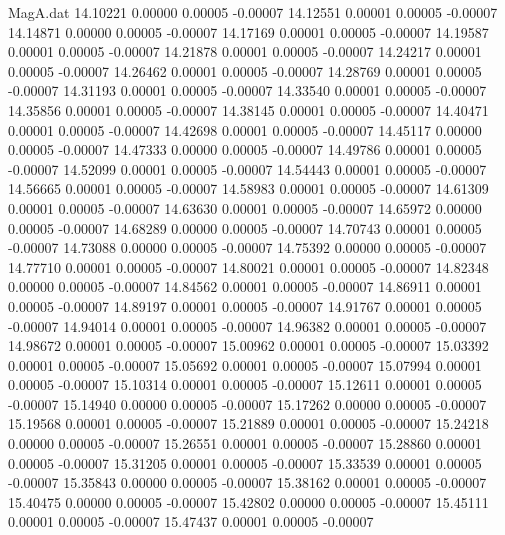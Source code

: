 \begin{filecontents}{MagA.dat}
  14.10221    0.00000    0.00005   -0.00007
  14.12551    0.00001    0.00005   -0.00007
  14.14871    0.00000    0.00005   -0.00007
  14.17169    0.00001    0.00005   -0.00007
  14.19587    0.00001    0.00005   -0.00007
  14.21878    0.00001    0.00005   -0.00007
  14.24217    0.00001    0.00005   -0.00007
  14.26462    0.00001    0.00005   -0.00007
  14.28769    0.00001    0.00005   -0.00007
  14.31193    0.00001    0.00005   -0.00007
  14.33540    0.00001    0.00005   -0.00007
  14.35856    0.00001    0.00005   -0.00007
  14.38145    0.00001    0.00005   -0.00007
  14.40471    0.00001    0.00005   -0.00007
  14.42698    0.00001    0.00005   -0.00007
  14.45117    0.00000    0.00005   -0.00007
  14.47333    0.00000    0.00005   -0.00007
  14.49786    0.00001    0.00005   -0.00007
  14.52099    0.00001    0.00005   -0.00007
  14.54443    0.00001    0.00005   -0.00007
  14.56665    0.00001    0.00005   -0.00007
  14.58983    0.00001    0.00005   -0.00007
  14.61309    0.00001    0.00005   -0.00007
  14.63630    0.00001    0.00005   -0.00007
  14.65972    0.00000    0.00005   -0.00007
  14.68289    0.00000    0.00005   -0.00007
  14.70743    0.00001    0.00005   -0.00007
  14.73088    0.00000    0.00005   -0.00007
  14.75392    0.00000    0.00005   -0.00007
  14.77710    0.00001    0.00005   -0.00007
  14.80021    0.00001    0.00005   -0.00007
  14.82348    0.00000    0.00005   -0.00007
  14.84562    0.00001    0.00005   -0.00007
  14.86911    0.00001    0.00005   -0.00007
  14.89197    0.00001    0.00005   -0.00007
  14.91767    0.00001    0.00005   -0.00007
  14.94014    0.00001    0.00005   -0.00007
  14.96382    0.00001    0.00005   -0.00007
  14.98672    0.00001    0.00005   -0.00007
  15.00962    0.00001    0.00005   -0.00007
  15.03392    0.00001    0.00005   -0.00007
  15.05692    0.00001    0.00005   -0.00007
  15.07994    0.00001    0.00005   -0.00007
  15.10314    0.00001    0.00005   -0.00007
  15.12611    0.00001    0.00005   -0.00007
  15.14940    0.00000    0.00005   -0.00007
  15.17262    0.00000    0.00005   -0.00007
  15.19568    0.00001    0.00005   -0.00007
  15.21889    0.00001    0.00005   -0.00007
  15.24218    0.00000    0.00005   -0.00007
  15.26551    0.00001    0.00005   -0.00007
  15.28860    0.00001    0.00005   -0.00007
  15.31205    0.00001    0.00005   -0.00007
  15.33539    0.00001    0.00005   -0.00007
  15.35843    0.00000    0.00005   -0.00007
  15.38162    0.00001    0.00005   -0.00007
  15.40475    0.00000    0.00005   -0.00007
  15.42802    0.00000    0.00005   -0.00007
  15.45111    0.00001    0.00005   -0.00007
  15.47437    0.00001    0.00005   -0.00007

\end{filecontents}

